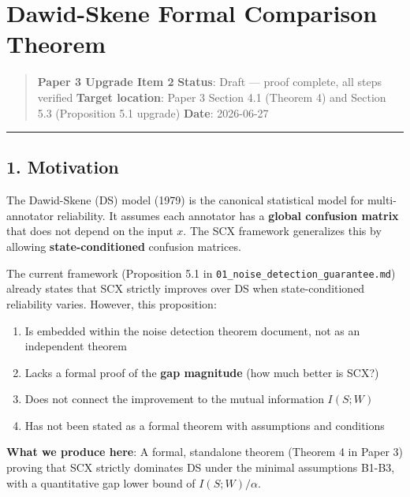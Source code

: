 \documentclass[
  12pt,
]{ctexart}
\author{SCX}
\date{2026}
\providecommand{\tightlist}{%
  \setlength{\itemsep}{0pt}\setlength{\parskip}{0pt}}
\begin{document}
\section{Dawid-Skene Formal Comparison
Theorem}\label{dawid-skene-formal-comparison-theorem}

\begin{quote}
\textbf{Paper 3 Upgrade Item 2} \textbf{Status}: Draft --- proof
complete, all steps verified \textbf{Target location}: Paper 3 Section
4.1 (Theorem 4) and Section 5.3 (Proposition 5.1 upgrade) \textbf{Date}:
2026-06-27
\end{quote}

\begin{center}\rule{0.5\linewidth}{0.5pt}\end{center}

\subsection{1. Motivation}\label{motivation}

The Dawid-Skene (DS) model (1979) is the canonical statistical model for
multi-annotator reliability. It assumes each annotator has a
\textbf{global confusion matrix} that does not depend on the input
\(x\). The SCX framework generalizes this by allowing
\textbf{state-conditioned} confusion matrices.

The current framework (Proposition 5.1 in
\texttt{01\_noise\_detection\_guarantee.md}) already states that SCX
strictly improves over DS when state-conditioned reliability varies.
However, this proposition:

\begin{enumerate}
\def\labelenumi{\arabic{enumi}.}
\tightlist
\item
  Is embedded within the noise detection theorem document, not as an
  independent theorem
\item
  Lacks a formal proof of the \textbf{gap magnitude} (how much better is
  SCX?)
\item
  Does not connect the improvement to the mutual information \(I(S; W)\)
\item
  Has not been stated as a formal theorem with assumptions and
  conditions
\end{enumerate}

\textbf{What we produce here}: A formal, standalone theorem (Theorem 4
in Paper 3) proving that SCX strictly dominates DS under the minimal
assumptions B1-B3, with a quantitative gap lower bound of
\(I(S; W)/\alpha\).
\end{document}
